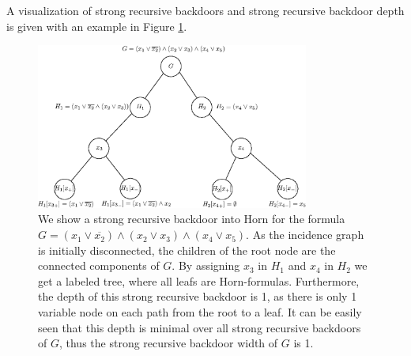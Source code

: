 \documentclass[11pt,a4paper]{article}
\theoremstyle{definition}
\theoremstyle{proposition}
\begin{document}
A visualization of strong recursive backdoors and strong recursive backdoor depth is given with an example in Figure \ref{fig:srb-1}. 
\begin{figure}[h]
        \centering
        \includegraphics[width=0.8\textwidth]{figures/srb-to-horn.eps}   
	\caption{We show a strong recursive backdoor into Horn for the formula $G = (x_1 \lor \overline{x_2}) \land (x_2 \lor x_3) \land (x_4 \lor x_5)$. As the incidence graph is initially disconnected, the children of the root node are the connected components of $G$. By assigning $x_3$ in $H_1$ and $x_4$ in $H_2$ we get a labeled tree, where all leafs are Horn-formulas. Furthermore, the depth of this strong recursive backdoor is 1, as there is only 1 variable node on each path from the root to a leaf. It can be easily seen that this depth is minimal over all strong recursive backdoors of $G$, thus the strong recursive backdoor width of $G$ is 1. }
	\label{fig:srb-1}
\end{figure}
\end{document}
